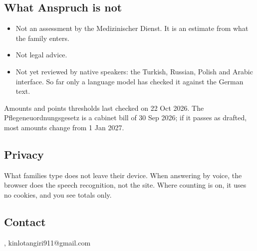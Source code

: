\documentclass[fontsize=10pt,paper=a4,parskip=half]{scrartcl}
\begin{document}
\begin{otherlanguage}{english}
\subsection*{What Anspruch is not}
\begin{itemize}
  \item Not an assessment by the Medizinischer Dienst. It is an estimate from what
    the family enters.
  \item Not legal advice.
  \item Not yet reviewed by native speakers: the Turkish, Russian, Polish and
    Arabic interface. So far only a language model has checked it against the
    German text.
\end{itemize}
{\small Amounts and points thresholds last checked on 22 Oct 2026. The
Pflegeneuordnungsgesetz is a cabinet bill of 30 Sep 2026; if it passes as drafted,
most amounts change from 1 Jan 2027.\par}

\subsection*{Privacy}
What families type does not leave their device. When answering by voice, the
browser does the speech recognition, not the site. Where counting is on, it uses no
cookies, and you see totals only.

\subsection*{Contact}
,  \quad kinlotangiri911@gmail.com \quad {}
\end{otherlanguage}
\end{document}
